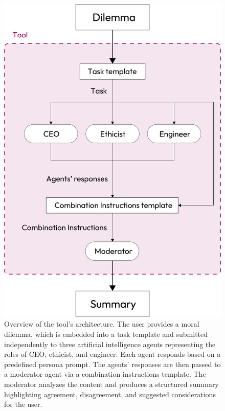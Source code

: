 \begin{figure}[h]
  \centering
  \includegraphics[width=\linewidth]{impl}
  \caption{Overview of the tool's architecture. The user provides a moral dilemma, which is embedded into a task template and submitted independently to three artificial intelligence agents representing the roles of CEO, ethicist, and engineer. Each agent responds based on a predefined persona prompt. The agents' responses are then passed to a moderator agent via a combination instructions template. The moderator analyzes the content and produces a structured summary highlighting agreement, disagreement, and suggested considerations for the user.}
  \label{fig:impl}
\end{figure}

